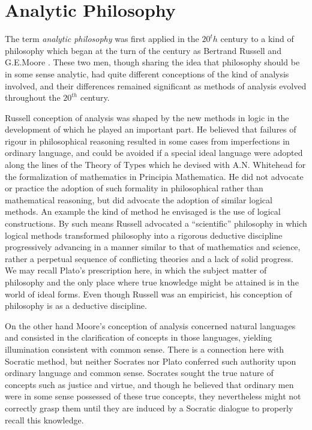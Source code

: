 \section{Analytic Philosophy}

The term \emph{analytic philosophy} was first applied in the $20^th$
century to a kind of philosophy which began at the turn of the century
as Bertrand Russell  and G.E.Moore
.
These two men, though sharing the idea that philosophy should be in
some sense analytic, had quite different conceptions of the kind of
analysis involved, and their differences remained significant as
methods of analysis evolved throughout the $20^{th}$ century.

Russell conception of analysis was shaped by the new methods in logic
in the development of which he played an important part.
He believed that failures of rigour in philosophical reasoning
resulted in some cases from imperfections in ordinary language, and
could be avoided if a special ideal language were adopted along the
lines of the Theory of Types which he devised with A.N. Whitehead
 for the formalization of mathematics in
Principia Mathematica.
He did not advocate or practice the adoption of such formality in
philosophical rather than mathematical reasoning, but did advocate the
adoption of similar logical methods.
An example the kind of method he envisaged is the use of logical
constructions.
By such means Russell advocated a ``scientific'' philosophy in which
logical methods transformed philosophy into a rigorous deductive
discipline progressively advancing in a manner similar to that of
mathematics and science, rather a perpetual sequence of conflicting
theories and a lack of solid progress.
We may recall Plato's prescription here, in which the subject matter
of philosophy and the only place where true knowledge might be
attained is in the world of ideal forms.
Even though Russell was an empiricist, his conception of philosophy is
as a deductive discipline.

On the other hand Moore's conception of analysis concerned natural
languages and consisted in the clarification of
concepts in those languages, yielding illumination consistent with
common sense.
There is a connection here with Socratic method, but neither Socrates
nor Plato conferred such authority upon ordinary language and common
sense.
Socrates sought the true nature of concepts such as justice and
virtue, and though he believed that ordinary men were in some sense
possessed of these true concepts, they nevertheless might not correctly
grasp them until they are induced by a Socratic dialogue to properly
recall this knowledge.

